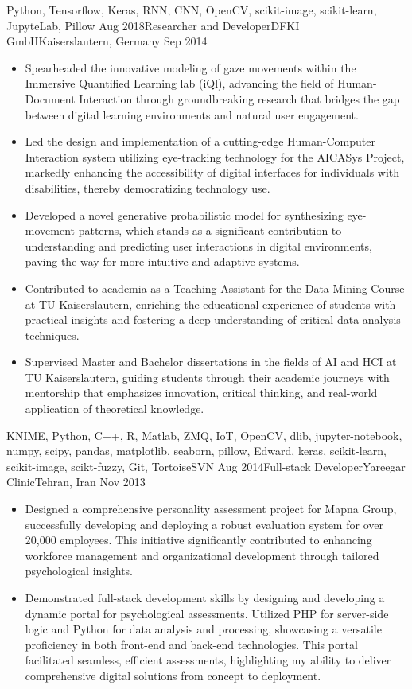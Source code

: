 \begin{experiences}
{\begin{itemize}
		\end{itemize}
	}
	{Python, Tensorflow, Keras, RNN, CNN, OpenCV, scikit-image, scikit-learn, JupyteLab, Pillow}
	\emptySeparator
	\experience
	{Aug 2018}{Researcher and Developer}{DFKI GmbH}{Kaiserslautern, Germany}
	{Sep 2014} {
		\begin{itemize}
			\item Spearheaded the innovative modeling of gaze movements within the Immersive Quantified Learning lab (iQl), advancing the field of Human-Document Interaction through groundbreaking research that bridges the gap between digital learning environments and natural user engagement.
			\item Led the design and implementation of a cutting-edge Human-Computer Interaction system utilizing eye-tracking technology for the AICASys Project, markedly enhancing the accessibility of digital interfaces for individuals with disabilities, thereby democratizing technology use.
			\item Developed a novel generative probabilistic model for synthesizing eye-movement patterns, which stands as a significant contribution to understanding and predicting user interactions in digital environments, paving the way for more intuitive and adaptive systems.
			\item Contributed to academia as a Teaching Assistant for the Data Mining Course at TU Kaiserslautern, enriching the educational experience of students with practical insights and fostering a deep understanding of critical data analysis techniques.
			\item Supervised Master and Bachelor dissertations in the fields of AI and HCI at TU Kaiserslautern, guiding students through their academic journeys with mentorship that emphasizes innovation, critical thinking, and real-world application of theoretical knowledge.

		\end{itemize}
	}
	{KNIME, Python, C++, R, Matlab, ZMQ, IoT, OpenCV, dlib, jupyter-notebook, numpy, scipy, pandas, matplotlib, seaborn, pillow, Edward, keras, scikit-learn, scikit-image, scikt-fuzzy, Git, TortoiseSVN}
	\emptySeparator
	\experience
	{Aug 2014}{Full-stack Developer}{Yareegar Clinic}{Tehran, Iran}
	{Nov 2013} {
		\begin{itemize}
			\item Designed a comprehensive personality assessment project for Mapna Group, successfully developing and deploying a robust evaluation system for over 20,000 employees. This initiative significantly contributed to enhancing workforce management and organizational development through tailored psychological insights.
			\item Demonstrated full-stack development skills by designing and developing a dynamic portal for psychological assessments. Utilized PHP for server-side logic and Python for data analysis and processing, showcasing a versatile proficiency in both front-end and back-end technologies. This portal facilitated seamless, efficient assessments, highlighting my ability to deliver comprehensive digital solutions from concept to deployment.


\end{itemize}}
\end{experiences}
